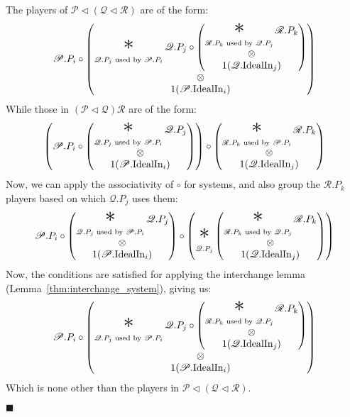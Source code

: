 \begin{lemma}
The players of $\mathscr{P} \lhd (\mathscr{Q} \lhd \mathscr{R})$ are of the form:
$$
  \mathscr{P}.P_i \circ
  \begin{pmatrix}
  \displaystyle \bigast_{\mathscr{Q}.P_j \text{ used by } \mathscr{P}.P_i } 
  \mathscr{Q}.P_j \circ
  \begin{pmatrix}
  \displaystyle \bigast_{\mathscr{R}.P_k \text{ used by } \mathscr{Q}.P_j } \mathscr{R}.P_k\cr
  \otimes\cr
  1(\mathscr{Q}.\tx{IdealIn}_j)
  \end{pmatrix}\cr
  \otimes\cr
  1(\mathscr{P}.\tx{IdealIn}_i)
  \end{pmatrix}
$$
While those in $(\mathscr{P} \lhd \mathscr{Q}) \mathscr{R}$ are of the form:
$$
  \left( \mathscr{P}.P_i \circ
  \begin{pmatrix}
  \displaystyle \bigast_{\mathscr{Q}.P_j \text{ used by } \mathscr{P}.P_i } 
  \mathscr{Q}.P_j\cr
  \otimes\cr
  1(\mathscr{P}.\tx{IdealIn}_i)
  \end{pmatrix}
  \right)
  \circ
  \begin{pmatrix}
    \displaystyle \bigast_{\mathscr{R}.P_k \text{ used by } \mathscr{P}.P_i } \mathscr{R}.P_k\cr
  \otimes\cr
  1(\mathscr{Q}.\tx{IdealIn}_j)
  \end{pmatrix}
$$
Now, we can apply the associativity of $\circ$ for systems, and also
group the $\mathscr{R}.P_k$ players based on which $\mathscr{Q}.P_j$ uses them:
$$
  \mathscr{P}.P_i \circ
  \begin{pmatrix}
  \displaystyle \bigast_{\mathscr{Q}.P_j \text{ used by } \mathscr{P}.P_i } 
  \mathscr{Q}.P_j\cr
  \otimes\cr
  1(\mathscr{P}.\tx{IdealIn}_i)
  \end{pmatrix}
  \circ
  \left(
    \displaystyle \bigast_{\mathscr{Q}.P_j}
  \begin{pmatrix}
  \displaystyle \bigast_{\mathscr{R}.P_k \text{ used by } \mathscr{Q}.P_j } \mathscr{R}.P_k
  \cr
  \otimes\cr
  1(\mathscr{Q}.\tx{IdealIn}_j)
  \end{pmatrix}
  \right)
$$
Now, the conditions are satisfied for applying the interchange lemma (Lemma~\ref{thm:interchange_system}),
giving us:
$$
  \mathscr{P}.P_i \circ
  \begin{pmatrix}
  \displaystyle \bigast_{\mathscr{Q}.P_j \text{ used by } \mathscr{P}.P_i } 
  \mathscr{Q}.P_j \circ
  \begin{pmatrix}
  \displaystyle \bigast_{\mathscr{R}.P_k \text{ used by } \mathscr{Q}.P_j } \mathscr{R}.P_k\cr
  \otimes\cr
  1(\mathscr{Q}.\tx{IdealIn}_j)
  \end{pmatrix}\cr
  \otimes\cr
  1(\mathscr{P}.\tx{IdealIn}_i)
  \end{pmatrix}
$$
Which is none other than the players in $\mathscr{P} \lhd (\mathscr{Q} \lhd \mathscr{R})$.

$\blacksquare$
\end{lemma}

